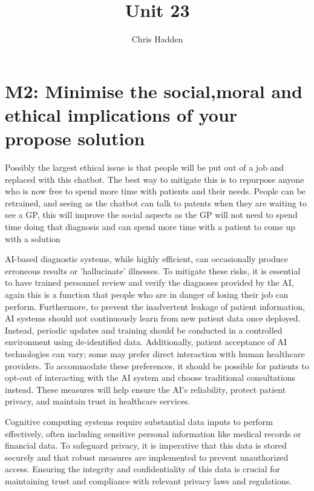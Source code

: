 \documentclass{article}
\title{Unit 23}
\author{Chris Hadden}
\date{}
\begin{document}
\maketitle

\section{M2: Minimise the social,moral and ethical implications of your propose solution}

Possibly the largest ethical issue is that people will be put out of a job and replaced with this chatbot. The best way to mitigate this is to repurpose anyone who is now free to spend more time with patients and their needs. People can be retrained, and seeing as the chatbot can talk to patents when they are waiting to see a GP, this will improve the social aspects as the GP will not need to spend time doing that diagnosis and can spend more time with a patient to come up with a solution


AI-based diagnostic systems, while highly efficient, can occasionally produce erroneous results or 'hallucinate' illnesses. To mitigate these risks, it is essential to have trained personnel review and verify the diagnoses provided by the AI, again this is a function that people who are in danger of losing their job can perform. Furthermore, to prevent the inadvertent leakage of patient information, AI systems should not continuously learn from new patient data once deployed. Instead, periodic updates and training should be conducted in a controlled environment using de-identified data. Additionally, patient acceptance of AI technologies can vary; some may prefer direct interaction with human healthcare providers. To accommodate these preferences, it should be possible for patients to opt-out of interacting with the AI system and choose traditional consultations instead. These measures will help ensure the AI's reliability, protect patient privacy, and maintain trust in healthcare services.


Cognitive computing systems require substantial data inputs to perform effectively, often including sensitive personal information like medical records or financial data. To safeguard privacy, it is imperative that this data is stored securely and that robust measures are implemented to prevent unauthorized access. Ensuring the integrity and confidentiality of this data is crucial for maintaining trust and compliance with relevant privacy laws and regulations.
\end{document}
